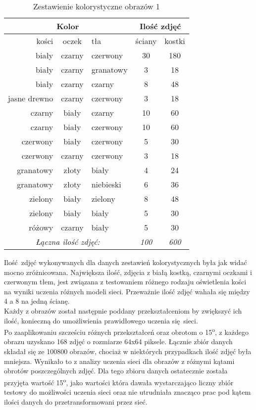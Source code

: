 \begin{table}[ht]
\centering
\begin{tabular}{rcl|cc}
 \multicolumn{3}{c}{Kolor} & \multicolumn{2}{c}{Ilość zdjęć} \\ \hline
kości & oczek & tła & ściany & kostki \\ \hline
biały & czarny & czerwony & 30 & 180 \\
biały & czarny & granatowy & 3 & 18 \\
biały & czarny & czarny & 8 & 48 \\
jasne drewno & czarny & czerwony & 3 & 18 \\
czarny & biały & czarny & 10 & 60 \\
czarny & biały & czerwony & 10 & 60 \\
czerwony & biały & czerwony & 5 & 30 \\
czerwony & czarny & czerwony & 3 & 18 \\
granatowy & złoty & biały & 4 & 24 \\
granatowy & złoty & niebieski & 6 & 36 \\
zielony & biały & zielony & 8 & 48 \\
zielony & biały & biały & 5 & 30 \\
różowy & czarny & biały & 5 & 30 \\ \hline
\multicolumn{3}{c}{\textit{Łączna ilość zdjęć:}} & \textit{100} & \textit{600}
\end{tabular}
\vspace{0.2cm}
\caption{Zestawienie kolorystyczne obrazów 1}
\label{tab:zestawienie1}
\end{table}

Ilość zdjęć wykonywanych dla danych zestawień kolorystycznych była jak widać mocno
zróżnicowana. Największa ilość, zdjęcia z białą kostką, czarnymi oczkami i czerwonym
tłem, jest związana z testowaniem różnego rodzaju oświetlenia kości na wyniki uczenia
różnych modeli sieci. Przeważnie ilość zdjęć wahała się między 4 a 8 na jedną ścianę. \\
Każdy z obrazów został następnie poddany przekształceniom by zwiększyć ich ilość,
konieczną do umożliwienia prawidłowego uczenia się sieci. \\
Po zaaplikowaniu szcześciu różnych przekształceń oraz obrotom o 15\textsuperscript{o}, z każdego
obrazu uzyskano 168 zdjęć o rozmiarze 64x64 piksele. Łącznie zbiór danych składał się
ze 100800 obrazów, chociaż w niektórych przypadkach ilość zdjęć była mniejsza.
Wynikało to z analizy uczenia sieci dla obrazów z różnymi kątami obrotów poszczególnych
zdjęć. Dla tego zbioru danych ostatecznie została przyjęta wartość 15\textsuperscript{o}, jako
wartości która dawała wystarczająco liczny zbiór testowy do możliwości uczenia sieci
oraz nie utrudniała znacząco prac pod kątem ilości danych do przetransformowani przez sieć.
